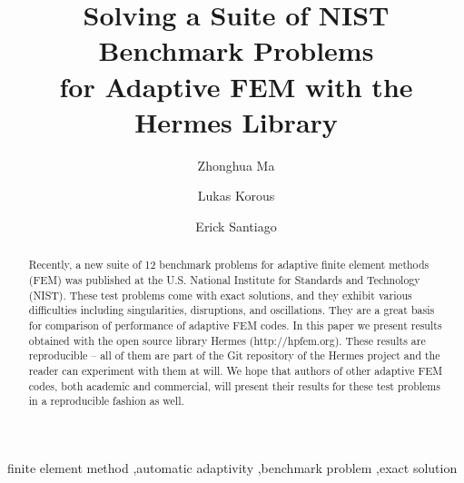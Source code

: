 \documentclass[12pt]{elsarticle}
\begin{document}
\begin{frontmatter}



\title{Solving a Suite of NIST Benchmark Problems\\ for Adaptive FEM with the Hermes Library}

\author[label1]{Zhonghua Ma}
\author[label2]{Lukas Korous}
\author[label3]{Erick Santiago}
\address[label1]{China University of Petroleum, Beijing, China}
\address[label2]{Charles University, Prague, Czech Republic}
\address[label3]{University of Nevada, Reno, USA}

\begin{abstract}
Recently, a new suite of 12 benchmark problems for adaptive finite element methods (FEM)
was published at the U.S. National Institute for Standards and Technology (NIST).
These test problems come with exact solutions, and they exhibit various difficulties
including singularities, disruptions, and oscillations. They are a great basis for comparison
of performance of adaptive FEM codes. In this paper we present results obtained
with the open source library Hermes (http://hpfem.org). These results are reproducible --
all of them are part of the Git repository of the Hermes project and the reader can experiment
with them at will. We hope that authors of other adaptive FEM codes, both academic and
commercial, will present their results for these test problems in a reproducible fashion as well.
\end{abstract}

\begin{keyword}
finite element method \sep automatic adaptivity \sep benchmark problem \sep exact solution
\end{keyword}

\end{frontmatter}
\end{document}
